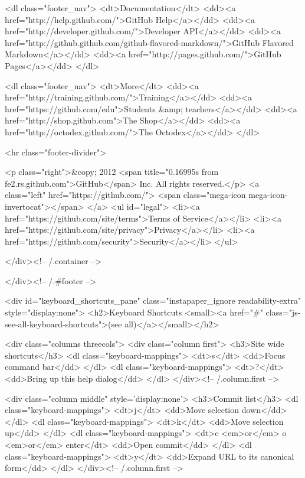      <dl class="footer_nav">
        <dt>Documentation</dt>
        <dd><a href="http://help.github.com/">GitHub Help</a></dd>
        <dd><a href="http://developer.github.com/">Developer API</a></dd>
        <dd><a href="http://github.github.com/github-flavored-markdown/">GitHub Flavored Markdown</a></dd>
        <dd><a href="http://pages.github.com/">GitHub Pages</a></dd>
      </dl>

      <dl class="footer_nav">
        <dt>More</dt>
        <dd><a href="http://training.github.com/">Training</a></dd>
        <dd><a href="https://github.com/edu">Students &amp; teachers</a></dd>
        <dd><a href="http://shop.github.com">The Shop</a></dd>
        <dd><a href="http://octodex.github.com/">The Octodex</a></dd>
      </dl>

      <hr class="footer-divider">


    <p class="right">&copy; 2012 <span title="0.16995s from fe2.rs.github.com">GitHub</span> Inc. All rights reserved.</p>
    <a class="left" href="https://github.com/">
      <span class="mega-icon mega-icon-invertocat"></span>
    </a>
    <ul id="legal">
        <li><a href="https://github.com/site/terms">Terms of Service</a></li>
        <li><a href="https://github.com/site/privacy">Privacy</a></li>
        <li><a href="https://github.com/security">Security</a></li>
    </ul>

  </div><!-- /.container -->

</div><!-- /.#footer -->


    

<div id="keyboard_shortcuts_pane" class="instapaper_ignore readability-extra" style="display:none">
  <h2>Keyboard Shortcuts <small><a href="#" class="js-see-all-keyboard-shortcuts">(see all)</a></small></h2>

  <div class="columns threecols">
    <div class="column first">
      <h3>Site wide shortcuts</h3>
      <dl class="keyboard-mappings">
        <dt>s</dt>
        <dd>Focus command bar</dd>
      </dl>
      <dl class="keyboard-mappings">
        <dt>?</dt>
        <dd>Bring up this help dialog</dd>
      </dl>
    </div><!-- /.column.first -->

    <div class="column middle" style='display:none'>
      <h3>Commit list</h3>
      <dl class="keyboard-mappings">
        <dt>j</dt>
        <dd>Move selection down</dd>
      </dl>
      <dl class="keyboard-mappings">
        <dt>k</dt>
        <dd>Move selection up</dd>
      </dl>
      <dl class="keyboard-mappings">
        <dt>c <em>or</em> o <em>or</em> enter</dt>
        <dd>Open commit</dd>
      </dl>
      <dl class="keyboard-mappings">
        <dt>y</dt>
        <dd>Expand URL to its canonical form</dd>
      </dl>
    </div><!-- /.column.first -->

